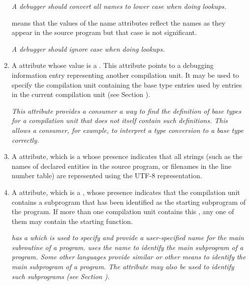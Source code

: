 \begin{enumerate}[1. ]
\textit{A debugger should convert all names to lower case
when doing lookups.}

\DWIDcaseinsensitiveTARG{} means that the values of the name
attributes reflect the names as they appear in the source
program but that case is not significant.

\textit{A debugger should ignore case when doing lookups.}

\item \hypertarget{chap:DWATbasetypesprimitivedatatypesofcompilationunit}{}
A \DWATbasetypesDEFN{} attribute
whose value is a .
This attribute points to a debugging information entry
representing another compilation unit.  It may be used
to specify the compilation unit containing the base type
entries used by entries in the current compilation unit
(see Section ).

\textit{This attribute provides a consumer a way to find the definition
of base types for a compilation unit that does not itself
contain such definitions. This allows a consumer, for example,
to interpret a type conversion to a base type correctly.}

\item \hypertarget{chap:DWATuseUTF8compilationunitusesutf8strings}{}
A \DWATuseUTFeightDEFN{} attribute,
which is a  whose
presence indicates that all strings (such as the names of
declared entities in the source program, or filenames in the line number table)
are represented using the UTF-8 representation.

\item%
\hypertarget{chap:DWATmainsubprogramunitcontainingmainorstartingsubprogram}{}
A \DWATmainsubprogramDEFN{} attribute,
which is a ,
whose presence indicates that the compilation unit contains a
subprogram that has been identified as the starting
subprogram of the program. If more than one compilation unit contains
this , any one of them may contain the starting
function.

\textit{ has a 
which is used
to specify and provide a user-specified name for the main
subroutine of a program.
 uses the name  to identify
the main subprogram of a program. Some other languages provide
similar or other means to identify the main subprogram of
a program. The \DWATmainsubprogram{} attribute may also be used to
identify such subprograms (see
Section ).}


\end{enumerate}
